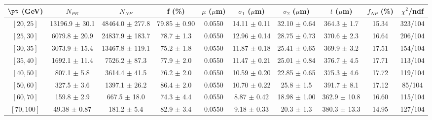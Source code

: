 \begin{tabular}{c||c|c|c|c|c|c|c||c|c}
$\pt$ (GeV) & $N_{PR}$ & $N_{NP}$ & f (\%) & $\mu$ ($\mu$m) & $\sigma_1$ ($\mu$m) & $\sigma_2$ ($\mu$m)  & $t$ ($\mu$m) & $f_{NP}$ (\%) & $\chi^2$/ndf \\
\hline
$[20, 25]$ & 13196.9 $\pm$ 30.1 & 48464.0 $\pm$ 277.8 & 79.85 $\pm$ 0.90 & 0.0550 & 14.11 $\pm$ 0.11 & 32.10 $\pm$ 0.64 & 364.3 $\pm$ 1.7 & 15.34 & 323/104\\
$[25, 30]$ & 6079.8 $\pm$ 20.9 & 24837.9 $\pm$ 183.7 & 78.7 $\pm$ 1.3 & 0.0550 & 12.96 $\pm$ 0.14 & 28.75 $\pm$ 0.73 & 370.6 $\pm$ 2.3 & 16.64 & 206/104\\
$[30, 35]$ & 3073.9 $\pm$ 15.4 & 13467.8 $\pm$ 119.1 & 75.2 $\pm$ 1.8 & 0.0550 & 11.87 $\pm$ 0.18 & 25.41 $\pm$ 0.65 & 369.9 $\pm$ 3.2 & 17.51 & 154/104\\
$[35, 40]$ & 1692.1 $\pm$ 11.4 & 7526.2 $\pm$ 87.3 & 77.9 $\pm$ 2.0 & 0.0550 & 11.47 $\pm$ 0.21 & 25.01 $\pm$ 0.84 & 376.7 $\pm$ 4.5 & 17.71 & 113/104\\
$[40, 50]$ & 807.1 $\pm$ 5.8 & 3614.4 $\pm$ 41.5 & 76.2 $\pm$ 2.0 & 0.0550 & 10.59 $\pm$ 0.20 & 22.85 $\pm$ 0.65 & 375.3 $\pm$ 4.6 & 17.72 & 119/104\\
$[50, 60]$ & 327.5 $\pm$ 3.6 & 1397.1 $\pm$ 26.2 & 86.4 $\pm$ 2.0 & 0.0550 & 10.70 $\pm$ 0.22 & 25.8 $\pm$ 1.5 & 391.7 $\pm$ 8.1 & 17.12 & 85/104\\
$[60, 70]$ & 159.8 $\pm$ 2.9 & 667.5 $\pm$ 18.0 & 74.3 $\pm$ 4.4 & 0.0550 & 8.87 $\pm$ 0.42 & 18.98 $\pm$ 1.00 & 362.9 $\pm$ 10.8 & 16.60 & 115/104\\
$[70, 100]$ & 49.38 $\pm$ 0.87 & 181.2 $\pm$ 5.4 & 82.9 $\pm$ 3.4 & 0.0550 & 9.18 $\pm$ 0.33 & 20.3 $\pm$ 1.3 & 380.3 $\pm$ 13.3 & 14.95 & 127/104\\
\end{tabular}
